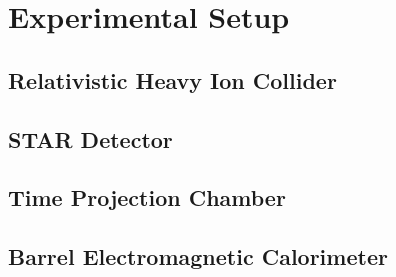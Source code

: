 \chapter{Experimental Setup}

\section{Relativistic Heavy Ion Collider}

\section{STAR Detector}

\section{Time Projection Chamber}

\section{Barrel Electromagnetic Calorimeter}
